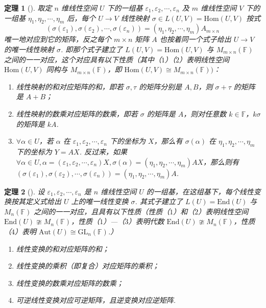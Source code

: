 \documentclass[zihao=-4,UTF8,linespread=1.8,nothm]{aytony_base}
\newtheorem{theorem}{\indent 定理}[subsection]
\begin{document}
\begin{theorem}[]
    取定 $n$ 维线性空间 $U$ 下的一组基 $\varepsilon_1, \varepsilon_2, \cdots, \varepsilon_n$ 及 $m$ 维线性空间 $V$ 下的一组基 $\eta_1, \eta_2, \cdots, \eta_m$ 后，每个 $U \to V$ 线性映射 $\sigma \in L(U, V) = \mathrm{Hom}(U, V)$ 按式 $$
        (\sigma(\varepsilon_1), \sigma(\varepsilon_2), \cdots, \sigma(\varepsilon_n)) = ({\eta}_1, {\eta}_2, \cdots, {\eta}_{m})A_{m \times n}
    $$ 唯一地对应到它的矩阵，反之每个 $m \times n$ 矩阵 $A$ 也按着同一个式子给出 $U \to V$ 的唯一线性映射 $\sigma$. 即那个式子建立了 $L(U, V) = \mathrm{Hom}(U, V)$ 与 $M_{m \times n}(\mathbb{F})$ 之间的一一对应，这个对应具有以下性质（其中（$1$）（$2$）表明线性空间 $\mathrm{Hom}(U, V)$ 同构与 $M_{m \times n}(\mathbb{F})$，即 $\mathrm{Hom}(U, V) \cong M_{m \times n}(\mathbb{F}))$：

    \begin{enumerate}[nosep]
        \item 线性映射的和对应矩阵的和，即若 $\sigma, \tau$ 的矩阵分别是 $A, B$，则 $\sigma + \tau$ 的矩阵是 $A + B$；
        \item 线性映射的数乘对应矩阵的数乘，即若 $\sigma$ 的矩阵是 $A$，则对任意数 $k \in \mathbb{F}$，$k\sigma$ 的矩阵是 $kA$.
        \item $\forall \alpha \in U$，若 $\alpha$ 在 $\varepsilon_1, \varepsilon_2, \cdots, \varepsilon_n$ 下的坐标为 $X$，那么有 $\sigma(\alpha)$ 在 $\eta_1, \eta_2, \cdots, \eta_m$ 下的坐标为 $Y = AX$. 反过来，如果 $\forall \alpha \in U, \alpha = (\varepsilon_1, \varepsilon_2, \cdots, \varepsilon_n)X, \sigma(\alpha) = (\eta_1, \eta_2, \cdots, \eta_m)AX$，那么则有 $(\sigma(\varepsilon_1), \sigma(\varepsilon_2), \cdots, \sigma(\varepsilon_n)) = (\eta_1, \eta_2, \cdots, \eta_m)A$.
    \end{enumerate}
\end{theorem}

\begin{theorem}[]
    设 $\varepsilon_1, \varepsilon_2, \cdots, \varepsilon_n$ 是 $n$ 维线性空间 $U$ 的一组基，在这组基下，每个线性变换按其定义式给出 $U$ 上的唯一线性变换 $\sigma$. 其式子建立了 $L(U) = \mathrm{End}(U)$ 与 $M_n(\mathbb{F})$ 之间的一一对应，且具有以下性质（性质（$1$）和（$2$）表明线性空间
    $\mathrm{End}(U)\ncong M_n(\mathbb{F})$，性质（$1$）---（$3$）表明代数 $\mathrm{End}(U) \ncong M_{n}(\mathbb{F})$，性质（$4$）表明 $\mathrm{Aut}(U)\cong \mathrm{GL}_n(\mathbb{F})$.）
    \begin{enumerate}[nosep]
        \item 线性变换的和对应矩阵的和；
        \item 线性变换的乘积（即复合）对应矩阵的乘积；
        \item 线性变换的数乘对应矩阵的数乘；
        \item 可逆线性变换对应可逆矩阵，且逆变换对应逆矩阵.
    \end{enumerate}
\end{theorem}
\end{document}
